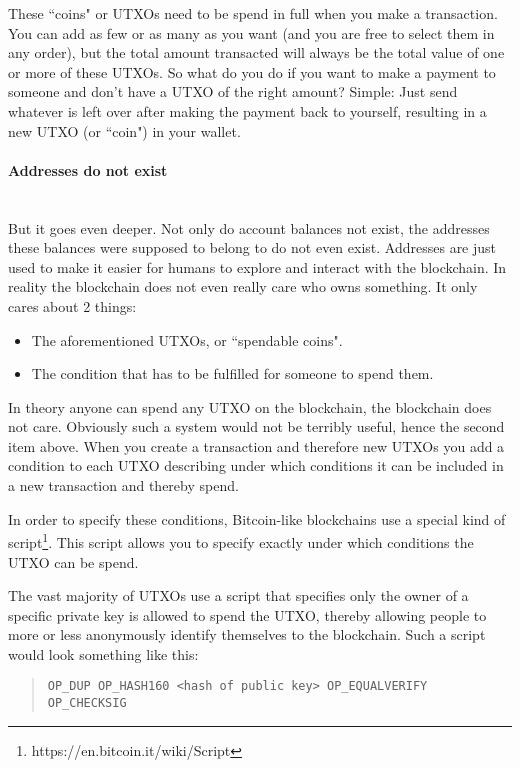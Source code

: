 \documentclass{article}
\begin{document}
These ``coins" or UTXOs need to be spend in full when you make a transaction. You can add as few or as many as you want (and you are free to select them in any order), but the total amount transacted will always be the total value of one or more of these UTXOs. So what do you do if you want to make a payment to someone and don't have a UTXO of the right amount? Simple: Just send whatever is left over after making the payment back to yourself, resulting in a new UTXO (or ``coin") in your wallet.

\paragraph{Addresses do not exist}\mbox{}\\
But it goes even deeper. Not only do account balances not exist, the addresses these balances were supposed to belong to do not even exist. Addresses are just used to make it easier for humans to explore and interact with the blockchain.
In reality the blockchain does not even really care who owns something. It only cares about 2 things:

\begin{itemize}
    \item The aforementioned UTXOs, or ``spendable coins".
    \item The condition that has to be fulfilled for someone to spend them.
\end{itemize}

In theory anyone can spend any UTXO on the blockchain, the blockchain does not care. Obviously such a system would not be terribly useful, hence the second item above. When you create a transaction and therefore new UTXOs you add a condition to each UTXO describing under which conditions it can be included in a new transaction and thereby spend.

In order to specify these conditions, Bitcoin-like blockchains use a special kind of script\footnote{https://en.bitcoin.it/wiki/Script}. This script allows you to specify exactly under which conditions the UTXO can be spend.

The vast majority of UTXOs use a script that specifies only the owner of a specific private key is allowed to spend the UTXO, thereby allowing people to more or less anonymously identify themselves to the blockchain. Such a script would look something like this:

\begin{quote}
    \texttt{OP\_DUP OP\_HASH160 <hash of public key> OP\_EQUALVERIFY OP\_CHECKSIG}
\end{quote}
\end{document}
